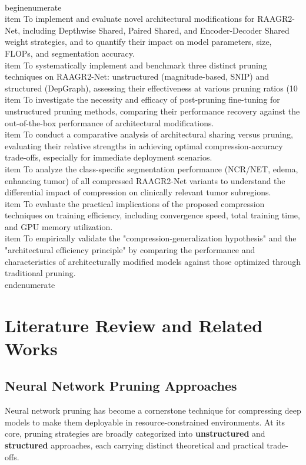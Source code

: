 \documentclass[12pt,a4paper]{article}
\begin{document}
\\begin{enumerate}
    \\item To implement and evaluate novel architectural modifications for RAAGR2-Net, including Depthwise Shared, Paired Shared, and Encoder-Decoder Shared weight strategies, and to quantify their impact on model parameters, size, FLOPs, and segmentation accuracy.
    \\item To systematically implement and benchmark three distinct pruning techniques on RAAGR2-Net: unstructured (magnitude-based, SNIP) and structured (DepGraph), assessing their effectiveness at various pruning ratios (10%
    \\item To investigate the necessity and efficacy of post-pruning fine-tuning for unstructured pruning methods, comparing their performance recovery against the out-of-the-box performance of architectural modifications.
    \\item To conduct a comparative analysis of architectural sharing versus pruning, evaluating their relative strengths in achieving optimal compression-accuracy trade-offs, especially for immediate deployment scenarios.
    \\item To analyze the class-specific segmentation performance (NCR/NET, edema, enhancing tumor) of all compressed RAAGR2-Net variants to understand the differential impact of compression on clinically relevant tumor subregions.
    \\item To evaluate the practical implications of the proposed compression techniques on training efficiency, including convergence speed, total training time, and GPU memory utilization.
    \\item To empirically validate the "compression-generalization hypothesis" and the "architectural efficiency principle" by comparing the performance and characteristics of architecturally modified models against those optimized through traditional pruning.
\\end{enumerate}

\section{Literature Review and Related Works}
\label{sec:literature}

\subsection{Neural Network Pruning Approaches}
\label{subsec:pruning}
Neural network pruning has become a cornerstone technique for compressing deep models to make them deployable in resource-constrained environments. At its core, pruning strategies are broadly categorized into \textbf{unstructured} and \textbf{structured} approaches, each carrying distinct theoretical and practical trade-offs.
\end{document}
